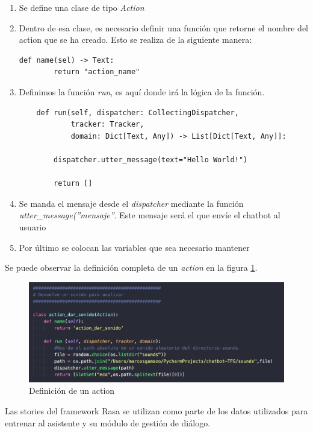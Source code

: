 \begin{enumerate}
    \item Se define una clase de tipo \textit{Action}
    \item Dentro de esa clase, es necesario definir una función que retorne el nombre del action que se ha creado. Esto se realiza de la siguiente manera: 
    \begin{lstlisting}[style=Python]
    def name(sel) -> Text:
        return "action_name"
    \end{lstlisting}
    \item Definimos la función \textit{run}, es aquí donde irá la lógica de la función.
    \begin{lstlisting}
    def run(self, dispatcher: CollectingDispatcher,
            tracker: Tracker,
            domain: Dict[Text, Any]) -> List[Dict[Text, Any]]:

        dispatcher.utter_message(text="Hello World!")

        return []
    \end{lstlisting}
    \item Se manda el mensaje desde el \textit{dispatcher} mediante la función \textit{utter\_message(''mensaje''}. Este mensaje será el que envíe el chatbot al usuario
    \item Por último se colocan las variables que sea necesario mantener
\end{enumerate}

Se puede observar la definición completa de un \textit{action} en la figura \ref{fig:rasa_action}.

\begin{figure}[H]
    \centering
    \includegraphics[scale=0.7]{include/capturas/RasaAction.png}
    \caption{Definición de un action}
    \label{fig:rasa_action}
\end{figure}


Las stories del framework Rasa se utilizan como parte de los datos utilizados para entrenar al asistente y su módulo de gestión de diálogo. 

